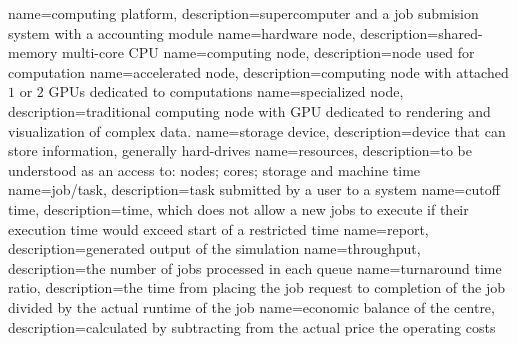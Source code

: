 
{
	name={computing platform},
	description={supercomputer and a job submision system with a accounting module}
}
{
	name={hardware node},
	description={shared-memory multi-core CPU}
}
{
	name={computing node},
	description={node used for computation}
}
{
	name={accelerated node},
	description={computing node with attached $1$ or $2$ GPUs dedicated to computations}
}
{
	name={specialized node},
	description={traditional computing node with GPU dedicated to rendering and visualization of complex data.}
}
{
	name={storage device},
	description={device that can store information, generally hard-drives}
}
{
	name={resources},
	description={to be understood as an access to: nodes; cores; storage and machine time}
}
{
	name={job/task},
	description={task submitted by a user to a system}
}
{
	name={cutoff time},
	description={time, which does not allow a new jobs to execute if their execution time would exceed start of a restricted time}
}
{
	name={report},
	description={generated output of the simulation}
}
{
	name={throughput},
	description={the number of jobs processed in each queue}
}
{
	name={turnaround time ratio},
	description={the time from placing the job request to completion  of the job divided by the actual runtime of the job}
}
{
	name={economic balance of the centre},
	description={calculated by subtracting from the actual price the operating costs}
}